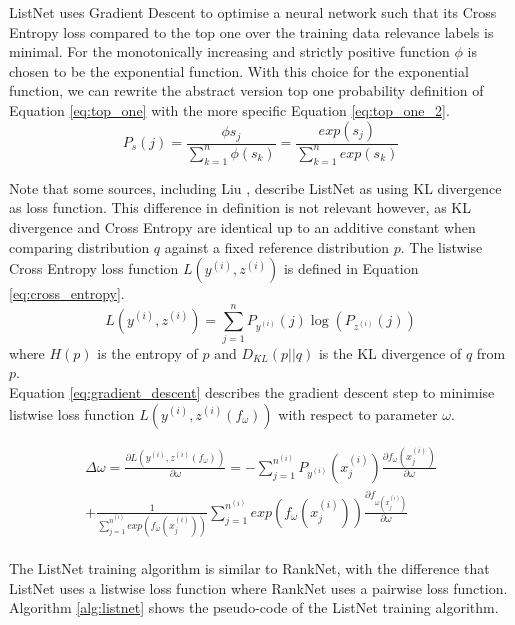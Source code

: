 ListNet uses Gradient Descent to optimise a neural network such that its Cross Entropy loss compared to the top one over the training data relevance labels is minimal. For the monotonically increasing and strictly positive function $\phi$ is chosen to be the exponential function. With this choice for the exponential function, we can rewrite the abstract version top one probability definition of Equation \ref{eq:top_one} with the more specific Equation \ref{eq:top_one_2}.\\
\begin{equation}
P_s(j) = \frac{\phi{s_j}}{\sum\nolimits_{k=1}^{n}\phi(s_k)} = \frac{exp(s_j)}{\sum\nolimits_{k=1}^{n}exp(s_k)}
\label{eq:top_one_2}
\end{equation}

Note that some sources, including Liu \cite{Liu2007}, describe ListNet as using \ac{KL divergence} as loss function. This difference in definition is not relevant however, as \ac{KL divergence} and Cross Entropy are identical up to an additive constant when comparing distribution $q$ against a fixed reference distribution $p$. The listwise Cross Entropy loss function $L(y^{(i)},z^{(i)})$ is defined in Equation \ref{eq:cross_entropy}.
\begin{equation}
L(y^{(i)},z^{(i)}) = \sum\limits_{j=1}^{n}P_{y^{(i)}}(j)\log(P_{z^{(i)}}(j))
\label{eq:cross_entropy}
\end{equation}
where $H(p)$ is the entropy of $p$ and $D_{KL}(p||q)$ is the \ac{KL divergence} of $q$ from $p$.\\

\noindent Equation \ref{eq:gradient_descent} describes the gradient descent step to minimise listwise loss function $L(y^{(i)},z^{(i)}(f_\omega))$ with respect to parameter $\omega$.

\begin{multline}
\Delta\omega = \frac{\partial L(y^{(i)},z^{(i)}(f_\omega))}{\partial \omega} = - \sum\limits_{j=1}^{n^{(i)}}P_{y^{(i)}}(x_{j}^{(i)})\frac{\partial f_{\omega}(x_{j}^{(i)})}{\partial\omega} \\ 
+ \frac{1}{\sum\nolimits_{j=1}^{n^{(i)}}exp(f_{\omega}(x_{j}^{(i)}))} \sum\limits_{j=1}^{n^{(i)}}exp(f_{\omega}(x_{j}^{(i)})) \frac{\partial f_{\omega(x_{j}^{(i)})}}{\partial\omega}
\label{eq:gradient_descent}
\end{multline}
\\
The ListNet training algorithm is similar to RankNet, with the difference that ListNet uses a listwise loss function where RankNet uses a pairwise loss function. Algorithm \ref{alg:listnet} shows the pseudo-code of the ListNet training algorithm.\\

